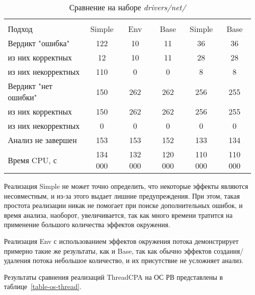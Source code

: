   \begin{table}[h]\footnotesize \centering
  	\label{table-drivers-thread}
    \caption{Сравнение  на наборе \textit{drivers/net/}}
    \begin{tabular}{ | l | c | c | c | c | c |}
      \hline
      					& \multicolumn{3}{c|}{\theoryraces} 			& \multicolumn{2}{c|}{\combatmode} 	\\
      Подход         				& Simple 	& Env 		& Base 		& Simple 	& Base  	\\ \hline
      Вердикт "ошибка" 				& 122    	& 10   		& 11   		& 36        & 36  	 	\\ 
  \hspace{0.5cm} из них корректных 	& 12 		& 10 		& 11   		& 28       	& 28   		\\ 
  \hspace{0.5cm} из них некорректных & 110 		& 0 		& 0   		& 8       	& 8     	\\ \hline
      Вердикт "нет ошибки"  		& 150      	& 262    	& 262    	& 256      	& 255     	\\ 
  \hspace{0.5cm} из них корректных 	& 150 		& 262    	& 262    	& 256       & 255   	\\
  \hspace{0.5cm} из них некорректных & 0 		& 0    		& 0     	& 0         & 0   		\\ \hline
      Анализ не завершен       		& 153     	& 153    	& 152    	& 133      	& 134   	\\ \hline
      Время CPU, с   				& 134 000 	& 132 000 	& 120 000 	& 110 000  	& 110 000   \\ 
      \hline
    \end{tabular}
  \end{table}

Реализация Simple не может точно определить, что некоторые эффекты являются несовместным, и из-за этого выдает лишние предупреждения.
При этом, такая простота реализации никак не помогает при поиске дополнительных ошибок, и время анализа, наоборот, увеличивается, так как много времени тратится на применение большого количества эффектов окружения.

Реализация Env с использованием эффектов окружения потока демонстрирует примерно такие же результаты, как и Base, так как обычно эффектов создания/удаления потока небольшое количество, и их присутствие не усложняет анализ.

Результаты сравнения реализаций ThreadCPA на ОС РВ представлены в таблице~\ref{table-os-thread}.

